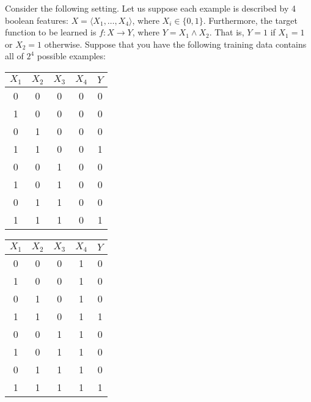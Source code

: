 \documentclass[11pt]{article}
\begin{document}
Consider the following setting. Let us suppose each example is described by 4 boolean features: $X = \langle X_1, \ldots, X_4 \rangle$, where $X_i \in \{0, 1\}$. Furthermore, the target function to be learned is $f : X \rightarrow Y$, where $Y =  X_1 \wedge X_2$. That is, $Y = 1$ if $X_1 = 1$ or $X_2 = 1$ otherwise. Suppose that you have the following training data contains all of $2^4$ possible examples:
\begin{table}[H]
\centering
\begin{tabular}{cccc|c}
$X_1$ & $X_2$ & $X_3$ & $X_4$ & $Y$\\ \hline
0 & 0 & 0 & 0 & 0\\
1 & 0 & 0 & 0 & 0\\
0 & 1 & 0 & 0 & 0\\
1 & 1 & 0 & 0 & 1\\
0 & 0 & 1 & 0 & 0\\
1 & 0 & 1 & 0 & 0\\
0 & 1 & 1 & 0 & 0\\
1 & 1 & 1 & 0 & 1\\
\end{tabular}
\quad \quad \quad \quad
\begin{tabular}{cccc|c}
$X_1$ & $X_2$ & $X_3$ & $X_4$ & $Y$\\ \hline
0 & 0 & 0 & 1 & 0\\
1 & 0 & 0 & 1 & 0\\
0 & 1 & 0 & 1 & 0\\
1 & 1 & 0 & 1 & 1\\
0 & 0 & 1 & 1 & 0\\
1 & 0 & 1 & 1 & 0\\
0 & 1 & 1 & 1 & 0\\
1 & 1 & 1 & 1 & 1\\
\end{tabular}
\end{table}
\end{document}
